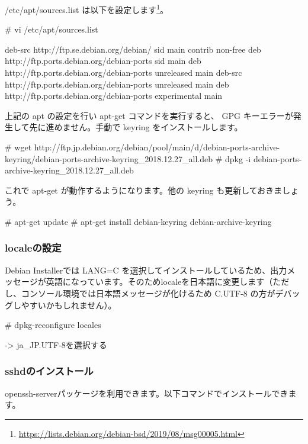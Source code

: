 \documentclass[mingoth,a4paper]{jsarticle}
\begin{document}
/etc/apt/sources.list は以下を設定します\footnote{\url{https://lists.debian.org/debian-bsd/2019/08/msg00005.html}}。

\begin{commandline}
# vi /etc/apt/sources.list
  
deb-src http://ftp.se.debian.org/debian/ sid main contrib non-free
deb http://ftp.ports.debian.org/debian-ports sid main
deb http://ftp.ports.debian.org/debian-ports unreleased main
deb-src http://ftp.ports.debian.org/debian-ports unreleased main
deb http://ftp.ports.debian.org/debian-ports experimental main
\end{commandline}

上記の apt の設定を行い apt-get コマンドを実行すると、 GPG キーエラーが発生して先に進めません。手動で keyring をインストールします。

\begin{commandline}
# wget http://ftp.jp.debian.org/debian/pool/main/d/debian-ports-archive-keyring/debian-ports-archive-keyring_2018.12.27_all.deb
# dpkg -i debian-ports-archive-keyring_2018.12.27_all.deb
\end{commandline}

これで apt-get が動作するようになります。他の keyring も更新しておきましょう。

\begin{commandline}
# apt-get update  
# apt-get install debian-keyring debian-archive-keyring
\end{commandline}


\subsubsection{localeの設定}

Debian Installerでは LANG=C を選択してインストールしているため、出力メッセージが英語になっています。そのためlocaleを日本語に変更します（ただし、コンソール環境では日本語メッセージが化けるため C.UTF-8 の方がデバッグしやすいかもしれません）。

\begin{commandline}
# dpkg-reconfigure locales

  -> ja_JP.UTF-8を選択する
\end{commandline}


\subsubsection{sshdのインストール}

openssh-serverパッケージを利用できます。以下コマンドでインストールできます。
\end{document}
